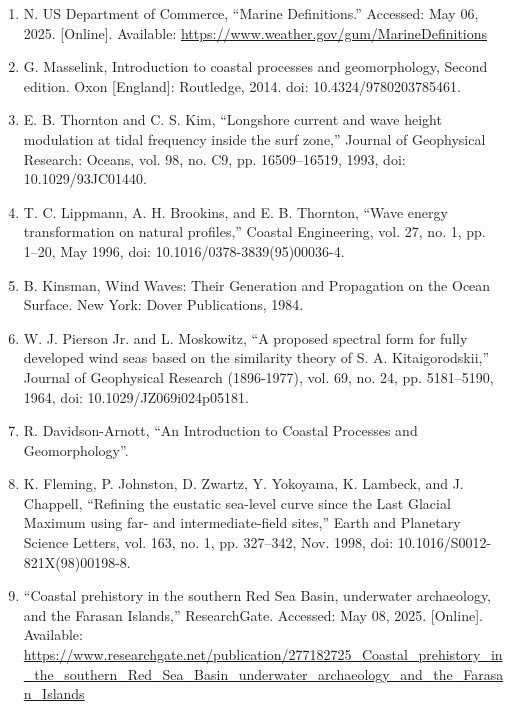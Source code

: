 \documentclass{article}
\begin{document}
\begin{sloppypar}
\begin{enumerate}
    \item{N. US Department of Commerce, “Marine Definitions.” Accessed: May 06, 2025. [Online]. Available: \url{https://www.weather.gov/gum/MarineDefinitions}}

    \item{G. Masselink, Introduction to coastal processes and geomorphology, Second edition. Oxon [England]: Routledge, 2014. doi: 10.4324/9780203785461.}

    \item{E. B. Thornton and C. S. Kim, “Longshore current and wave height modulation at tidal frequency inside the surf zone,” Journal of Geophysical Research: Oceans, vol. 98, no. C9, pp. 16509–16519, 1993, doi: 10.1029/93JC01440.}

    \item{T. C. Lippmann, A. H. Brookins, and E. B. Thornton, “Wave energy transformation on natural profiles,” Coastal Engineering, vol. 27, no. 1, pp. 1–20, May 1996, doi: 10.1016/0378-3839(95)00036-4.}

    \item{B. Kinsman, Wind Waves: Their Generation and Propagation on the Ocean Surface. New York: Dover Publications, 1984.}

    \item{W. J. Pierson Jr. and L. Moskowitz, “A proposed spectral form for fully developed wind seas based on the similarity theory of S. A. Kitaigorodskii,” Journal of Geophysical Research (1896-1977), vol. 69, no. 24, pp. 5181–5190, 1964, doi: 10.1029/JZ069i024p05181.}

    \item{R. Davidson-Arnott, “An Introduction to Coastal Processes and Geomorphology”.}

    \item{K. Fleming, P. Johnston, D. Zwartz, Y. Yokoyama, K. Lambeck, and J. Chappell, “Refining the eustatic sea-level curve since the Last Glacial Maximum using far- and intermediate-field sites,” Earth and Planetary Science Letters, vol. 163, no. 1, pp. 327–342, Nov. 1998, doi: 10.1016/S0012-821X(98)00198-8.}

     \item{“Coastal prehistory in the southern Red Sea Basin, underwater archaeology, and the Farasan Islands,” ResearchGate. Accessed: May 08, 2025. [Online]. Available: \url{https://www.researchgate.net/publication/277182725_Coastal_prehistory_in_the_southern_Red_Sea_Basin_underwater_archaeology_and_the_Farasan_Islands}}


\end{enumerate}
\end{sloppypar}
\end{document}
